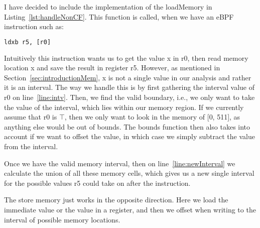 I have decided to include the implementation of the loadMemory in
Listing~\ref{lst:handleNonCF}. This function is called, when we have an eBPF
instruction such as:
\begin{lstlisting}[language={haskell}, numbers=none]
ldxb r5, [r0]
\end{lstlisting}
Intuitively this instruction wants us to get the value x in r0, then read
memory location x and save the result in register r5. However, as mentioned in
Section~\ref{sec:introductionMem}, x is not a single value in our analysis and
rather it is an interval. The way we handle this is by first gathering the
interval value of r0 on line~\ref{line:intv}. Then, we find the valid boundary,
i.e., we only want to take the value of the interval, which lies within our
memory region. If we currently assume that r0 is $\top$, then we only want to look
in the memory of [0, 511], as anything else would be out of bounds. The bounds
function then also takes into account if we want to offset the value, in which
case we simply subtract the value from the interval.

Once we have the valid memory interval, then on line~\ref{line:newInterval} we
calculate the union of all these memory cells, which gives us a new single
interval for the possible values r5 could take on after the instruction. 

The store memory just works in the opposite direction. Here we load the
immediate value or the value in a register, and then we offset when writing to
the interval of possible memory locations.



